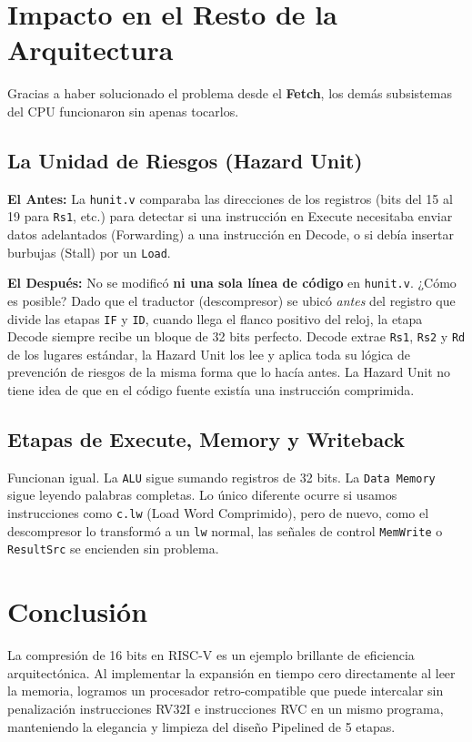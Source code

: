 \documentclass[12pt, a4paper]{article}
\begin{document}
\section{Impacto en el Resto de la Arquitectura}

Gracias a haber solucionado el problema desde el \textbf{Fetch}, los dem\'as subsistemas del CPU funcionaron sin apenas tocarlos.

\subsection{La Unidad de Riesgos (Hazard Unit)}
\textbf{El Antes:} La \texttt{hunit.v} comparaba las direcciones de los registros (bits del 15 al 19 para \texttt{Rs1}, etc.) para detectar si una instrucci\'on en Execute necesitaba enviar datos adelantados (Forwarding) a una instrucci\'on en Decode, o si deb\'ia insertar burbujas (Stall) por un \texttt{Load}.

\textbf{El Despu\'es:} No se modific\'o \textbf{ni una sola l\'inea de c\'odigo} en \texttt{hunit.v}. 
¿C\'omo es posible? Dado que el traductor (descompresor) se ubic\'o \textit{antes} del registro que divide las etapas \texttt{IF} y \texttt{ID}, cuando llega el flanco positivo del reloj, la etapa Decode siempre recibe un bloque de 32 bits perfecto. Decode extrae \texttt{Rs1}, \texttt{Rs2} y \texttt{Rd} de los lugares est\'andar, la Hazard Unit los lee y aplica toda su l\'ogica de prevenci\'on de riesgos de la misma forma que lo hac\'ia antes. La Hazard Unit no tiene idea de que en el c\'odigo fuente exist\'ia una instrucci\'on comprimida.

\subsection{Etapas de Execute, Memory y Writeback}
Funcionan igual. La \texttt{ALU} sigue sumando registros de 32 bits. La \texttt{Data Memory} sigue leyendo palabras completas. Lo \'unico diferente ocurre si usamos instrucciones como \texttt{c.lw} (Load Word Comprimido), pero de nuevo, como el descompresor lo transform\'o a un \texttt{lw} normal, las se\~nales de control \texttt{MemWrite} o \texttt{ResultSrc} se encienden sin problema.

\section{Conclusi\'on}
La compresi\'on de 16 bits en RISC-V es un ejemplo brillante de eficiencia arquitect\'onica. Al implementar la expansi\'on en tiempo cero directamente al leer la memoria, logramos un procesador retro-compatible que puede intercalar sin penalizaci\'on instrucciones RV32I e instrucciones RVC en un mismo programa, manteniendo la elegancia y limpieza del dise\~no Pipelined de 5 etapas.
\end{document}
